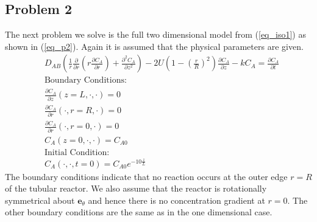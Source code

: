 \documentclass[11pt,fleqn]{article}
\theoremstyle{defstyle}
\begin{document}
\subsection{Problem 2}
\label{section_iso2}
The next problem we solve is the full two dimensional model from (\ref{eq_iso1}) as shown in (\ref{eq_p2}). Again it is assumed that the physical parameters are given.
\begin{equation}
\begin{aligned}
&D_{AB}\left(\frac{1}{r}\frac{\partial}{\partial r}\left(r\frac{\partial C_A}{\partial r}\right) + \frac{\partial^2 C_A}{\partial z^2}\right) - 2U\left(1-\left(\frac{r}{R}\right)^2\right)\frac{\partial C_A}{\partial z} - kC_A = \frac{\partial C_A}{\partial t}\\
&\text{Boundary Conditions:} \\
&\frac{\partial C_A}{\partial z}(z=L, \cdot, \cdot) = 0\\
&\frac{\partial C_A}{\partial r}(\cdot, r = R, \cdot) = 0 \\
&\frac{\partial C_A}{\partial r}(\cdot, r = 0, \cdot) = 0 \\
&C_A(z=0,\cdot, \cdot) = C_{A0} \\
&\text{Initial Condition:} \\
& C_A(\cdot, \cdot, t= 0) = C_{A0}e^{-10\frac{z}{L}}
\end{aligned}
\label{eq_p2}
\end{equation}
The boundary conditions indicate that no reaction occurs at the outer edge $r=R$ of the tubular reactor. We also assume that the reactor is rotationally symmetrical about $\mathbf{e}_\theta$ and hence there is no concentration gradient at $r=0$. The other boundary conditions are the same as in the one dimensional case. 
\end{document}
